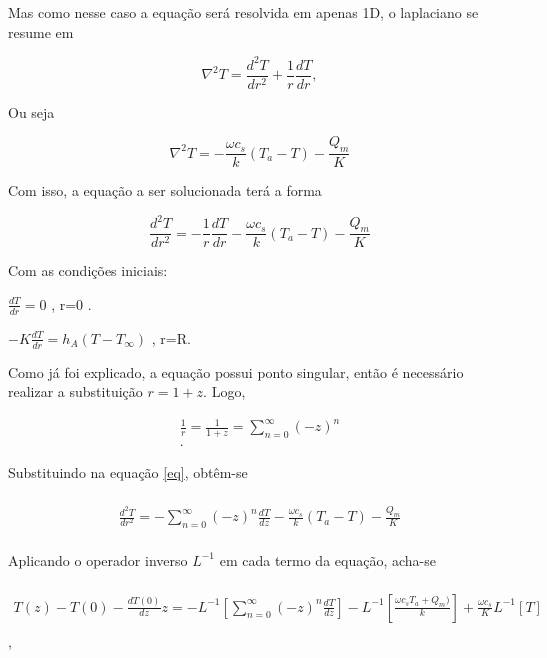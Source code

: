  Mas como nesse caso a equação será resolvida em apenas 1D, o laplaciano se resume em
 
 \begin{equation} 
\nabla^{2}T = \frac{d^{2}T}{dr^{2}} + \frac{1}{r}\frac{dT}{dr},\end{equation}
 
 Ou seja
 
 \begin{equation} 
 \nabla^{2}T = - \frac{\omega c_{s}}{k} (T_{a} - T ) - \frac{Q_{m}}{K}\end{equation}

Com isso, a equação a ser solucionada terá a forma


 \begin{equation} 
\frac{d^{2}T}{dr^{2}} = -\frac{1}{r}\frac{dT}{dr}- \frac{\omega c_{s}}{k} (T_{a} - T ) - \frac{Q_{m}}{K}\end{equation}\label{eq}

Com as condições iniciais:


$\frac{dT}{dr} = 0$ , r=0  .

$-K\frac{dT}{dr} = h_{A}(T-T_{\infty})$ , r=R.




Como já foi explicado, a equação possui ponto singular, então é necessário realizar a substituição $r = 1+z$. Logo, 

\begin{gather}
\frac{1}{r} = \frac{1}{1+z} = \sum_{n=0}^{\infty} (-z)^{n}\nonumber\\ .
\end{gather}

Substituindo na equação \ref{eq}, obtêm-se


 \begin{gather} \nonumber\\
\frac{d^{2}T}{dr^{2}} = -\sum_{n=0}^{\infty} (-z)^{n}\frac{dT}{dz} - \frac{\omega c_{s}}{k} (T_{a} - T ) - \frac{Q_{m}}{K}\nonumber\\\end{gather}

Aplicando o operador inverso $L^{-1}$ em cada termo da equação, acha-se

\begin{gather} \nonumber\\
T(z) - T(0) - \frac{dT(0)}{dz}z = -L^{-1} \left[\sum_{n=0}^{\infty} (-z)^{n}\frac{dT}{dz}\right] - L^{-1}\left[\frac{\omega c_{s}T_{a} + Q_{m} )}{k}\right] + \frac{\omega c_s}{K}L^{-1}[T]\nonumber\\\end{gather},


